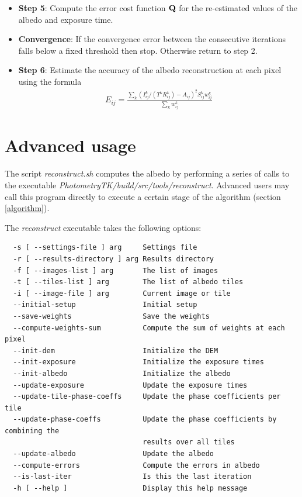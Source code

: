 \documentclass[letterpaper,fleqn,11pt]{report}
\begin{document}
\begin{itemize}
\item {\bf Step 5}: Compute the error cost function $\bf Q$ for the re-estimated values of the albedo and exposure time.

\item {\bf Convergence}: If the convergence error between the consecutive iterations falls below a fixed threshold then stop. Otherwise return to step 2.

\item {\bf Step 6}: Estimate the accuracy of the albedo reconstruction
  at each pixel using the formula
\begin{eqnarray}
E_{ij}=\frac{\sum_k (I_{ij}^k/(T^k R^k_{ij})-A_{ij}) ^2S^k_{ij}w^k_{ij}}{\sum_k w^k_{ij}}
\label{albedo_error}
\end {eqnarray}

\end{itemize}

\section{Advanced usage}

The script {\it reconstruct.sh} computes the albedo by performing a
series of calls to the executable
{\it PhotometryTK/build/src/tools/reconstruct}. Advanced users may call this
program directly to execute a certain stage of the algorithm (section \ref{algorithm}).

The {\it reconstruct} executable takes the following options:

\begin{verbatim}
  -s [ --settings-file ] arg     Settings file
  -r [ --results-directory ] arg Results directory
  -f [ --images-list ] arg       The list of images
  -t [ --tiles-list ] arg        The list of albedo tiles
  -i [ --image-file ] arg        Current image or tile
  --initial-setup                Initial setup
  --save-weights                 Save the weights
  --compute-weights-sum          Compute the sum of weights at each pixel
  --init-dem                     Initialize the DEM
  --init-exposure                Initialize the exposure times
  --init-albedo                  Initialize the albedo
  --update-exposure              Update the exposure times
  --update-tile-phase-coeffs     Update the phase coefficients per tile
  --update-phase-coeffs          Update the phase coefficients by combining the
                                 results over all tiles
  --update-albedo                Update the albedo
  --compute-errors               Compute the errors in albedo
  --is-last-iter                 Is this the last iteration
  -h [ --help ]                  Display this help message
\end{verbatim}
\end{document}
